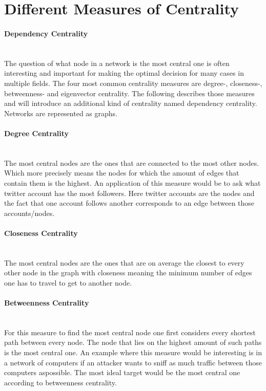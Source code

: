 \maketitle
\section{Different Measures of Centrality}

\paragraph{Dependency Centrality}\mbox{} \medskip \\
The question of what node in a network is the most central one is often interesting
and important for making the optimal decision for many cases in multiple fields. 
The four most common centrality measures are degree-, closeness-, betweenness- and eigenvector 
centrality. The following describes those measures and will introduce an additional kind of 
centrality named dependency centrality. Networks are represented as graphs.

\paragraph{Degree Centrality}\mbox{} \medskip \\
The most central nodes are the ones that are connected to the most other nodes.
Which more precisely means the nodes for which the amount of edges that contain them is the highest. 
An application of this measure would be to ask what twitter account has the most followers.
Here twitter accounts are the nodes and the fact that one account follows another corresponds 
to an edge between those accounts/nodes.

\paragraph{Closeness Centrality}\mbox{} \medskip \\
The most central nodes are the ones that are on average the closest to every other node
in the graph with closeness meaning the minimum number of edges one has to travel to get to another node.

\paragraph{Betweenness Centrality}\mbox{} \medskip \\
For this measure to find the most central node one first considers every shortest
path between every node. The node that lies on the highest amount of such paths is the
most central one. An example where this measure would be interesting is in a network
of computers if an attacker wants to sniff as much traffic between those computers aspossible.
The most ideal target would be the most central one according to betweenness centrality.

